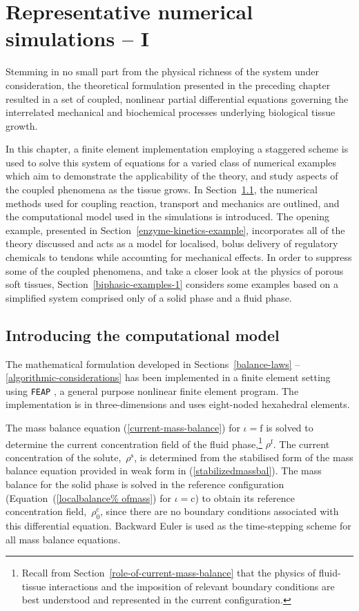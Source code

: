 \chapter{Representative numerical simulations -- I}
\label{numerical-simulations-1}

Stemming in no small part from the physical richness of the system
under consideration, the theoretical formulation presented in the
preceding chapter resulted in a set of coupled, nonlinear partial
differential equations governing the interrelated mechanical and
biochemical processes underlying biological tissue growth.

In this chapter, a finite element implementation employing a staggered
scheme is used to solve this system of equations for a varied class of
numerical examples which aim to demonstrate the applicability of the
theory, and study aspects of the coupled phenomena as the tissue
grows. In Section~\ref{computational-model}, the numerical methods
used for coupling reaction, transport and mechanics are outlined, and
the computational model used in the simulations is introduced. The
opening example, presented in Section~\ref{enzyme-kinetics-example},
incorporates all of the theory discussed and acts as a model for
localised, bolus delivery of regulatory chemicals to tendons while
accounting for mechanical effects. In order to suppress some of the
coupled phenomena, and take a closer look at the physics of porous
soft tissues, Section~\ref{biphasic-examples-1} considers some
examples based on a simplified system comprised only of a solid phase
and a fluid phase.

\section{Introducing the computational model}
\label{computational-model}

The mathematical formulation developed in Sections~\ref{balance-laws}%
--\ref{algorithmic-considerations} has been implemented in a finite
element setting using {\tt FEAP} \citep{FEAPmanual}, a general purpose
nonlinear finite element program. The implementation is in
three-dimensions and uses eight-noded hexahedral elements.

The mass balance equation (\ref{current-mass-balance}) for
\mbox{$\iota = \mathrm{f}$} is solved to determine the current
concentration field of the fluid phase,\footnote{Recall from
  Section~\ref{role-of-current-mass-balance} that the physics of
  fluid-tissue interactions and the imposition of relevant boundary
  conditions are best understood and represented in the current
  configuration.} $\rho^{\mathrm{f}}$. The current concentration of
the solute,~$\rho^{\mathrm{s}}$, is determined from the stabilised
form of the mass balance equation provided in weak form in
(\ref{stabilizedmassbal}). The mass balance for the solid phase is
solved in the reference configuration (Equation~(\ref{localbalance%
  ofmass}) for \mbox{$\iota = \mathrm{c}$}) to obtain its reference
concentration field,~$\rho_{0}^{\mathrm{c}}$, since there are no
boundary conditions associated with this differential
equation. Backward Euler is used as the time-stepping scheme for all
mass balance equations.

